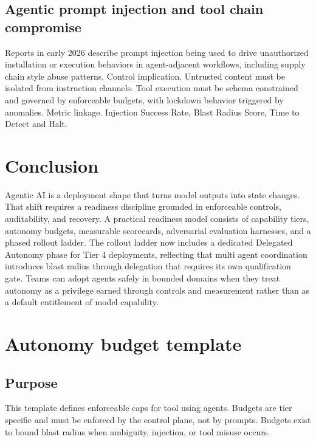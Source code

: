 \documentclass[11pt]{article}
\begin{document}
\subsection{Agentic prompt injection and tool chain compromise}
Reports in early 2026 describe prompt injection being used to drive unauthorized installation or execution behaviors in agent-adjacent workflows, including supply chain style abuse patterns. Control implication. Untrusted content must be isolated from instruction channels. Tool execution must be schema constrained and governed by enforceable budgets, with lockdown behavior triggered by anomalies. Metric linkage. Injection Success Rate, Blast Radius Score, Time to Detect and Halt.

\section{Conclusion}
Agentic AI is a deployment shape that turns model outputs into state changes. That shift requires a readiness discipline grounded in enforceable controls, auditability, and recovery. A practical readiness model consists of capability tiers, autonomy budgets, measurable scorecards, adversarial evaluation harnesses, and a phased rollout ladder. The rollout ladder now includes a dedicated Delegated Autonomy phase for Tier 4 deployments, reflecting that multi agent coordination introduces blast radius through delegation that requires its own qualification gate. Teams can adopt agents safely in bounded domains when they treat autonomy as a privilege earned through controls and measurement rather than as a default entitlement of model capability.

\appendix

\section{Autonomy budget template}

\subsection{Purpose}
This template defines enforceable caps for tool using agents. Budgets are tier specific and must be enforced by the control plane, not by prompts. Budgets exist to bound blast radius when ambiguity, injection, or tool misuse occurs.
\end{document}
